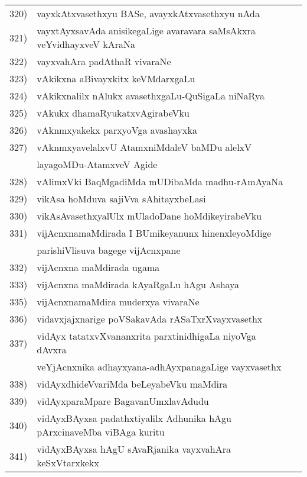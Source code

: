{\begin{longtable}{@{}cp{7.4cm}r}
320) & vayxkAtxvasethxyu BASe, avayxkAtxvasethxyu nAda & \pageref{page8}\\
321) & vayxtAyxsavAda anisikegaLige avaravara saMsAkxra veYvidhayxveV kAraNa & \pageref{page176}\\
322) & vayxvahAra padAthaR vivaraNe & \pageref{page23}\\  
323) & vAkikxna aBivayxkitx keVMdarxgaLu & \pageref{page8}\\
324) & vAkikxnalilx nAlukx avasethxgaLu-QuSigaLa niNaRya & \pageref{page8}\\
325) & vAkukx dhamaRyukatxvAgirabeVku & \pageref{page110}\\
326) & vAknmxyakekx parxyoVga avashayxka & \pageref{page110}\\
327) & vAknmxyavelalxvU AtamxniMdaleV baMDu alelxV  & \\
     & layagoMDu-AtamxveV Agide & \pageref{page195}\\
328) & vAlimxVki BaqMgadiMda mUDibaMda madhu-rAmAyaNa & \pageref{page238}\\
329)  & vikAsa hoMduva sajiVva sAhitayxbeLasi & \pageref{page79}\\ 
330) & vikAsAvasethxyalUlx mUladoDane hoMdikeyirabeVku & \pageref{page178}\\
331) & vijAcnxnamaMdirada I BUmikeyanunx hinenxleyoMdige  & \\
     & parishiVlisuva bagege vijAcnxpane & \pageref{page29}\\
332) & vijAcnxna maMdirada ugama & \pageref{page65}\\
333) & vijAcnxna maMdirada kAyaRgaLu hAgu Ashaya & \pageref{page22}\\ 
335) & vijAcnxnamaMdira muderxya vivaraNe & \pageref{page71}\\ 
336) & vidavxjajxnarige poVSakavAda rASaTxrXvayxvasethx & \pageref{page46}\\
337) & vidAyx tatatxvXvananxrita parxtinidhigaLa niyoVga dAvxra & \\
     & veYjAcnxnika adhayxyana-adhAyxpanagaLige vayxvasethx & \pageref{page55}\\
338) & vidAyxdhideVvariMda beLeyabeVku maMdira & \pageref{page66}\\
339) & vidAyxparaMpare BagavanUmxlavAdudu & \pageref{page70}\\
340) & vidAyxBAyxsa padathxtiyalilx Adhunika hAgu pArxcinaveMba viBAga kuritu & \pageref{page38}\\
341) & vidAyxBAyxsa hAgU sAvaRjanika vayxvahAra keSxVtarxkekx & \\

\end{longtable}}

